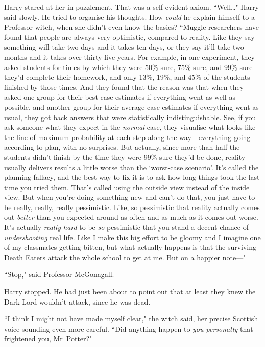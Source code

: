 Harry stared at her in puzzlement. That was a self-evident axiom. ``Well…" Harry said slowly. He tried to organise his thoughts. How \emph{could} he explain himself to a Professor-witch, when she didn't even know the basics? ``Muggle researchers have found that people are always very optimistic, compared to reality. Like they say something will take two days and it takes ten days, or they say it'll take two months and it takes over thirty-five years. For example, in one experiment, they asked students for times by which they were 50\% sure, 75\% sure, and 99\% sure they'd complete their homework, and only 13\%, 19\%, and 45\% of the students finished by those times. And they found that the reason was that when they asked one group for their best-case estimates if everything went as well as possible, and another group for their average-case estimates if everything went as usual, they got back answers that were statistically indistinguishable. See, if you ask someone what they expect in the \emph{normal} case, they visualise what looks like the line of maximum probability at each step along the way—everything going according to plan, with no surprises. But actually, since more than half the students didn't finish by the time they were 99\% sure they'd be done, reality usually delivers results a little worse than the `worst-case scenario'. It's called the planning fallacy, and the best way to fix it is to ask how long things took the last time you tried them. That's called using the outside view instead of the inside view. But when you're doing something new and can't do that, you just have to be really, really, really pessimistic. Like, so pessimistic that reality actually comes out \emph{better} than you expected around as often and as much as it comes out worse. It's actually \emph{really hard} to be \emph{so} pessimistic that you stand a decent chance of \emph{undershooting} real life. Like I make this big effort to be gloomy and I imagine one of my classmates getting bitten, but what actually happens is that the surviving Death Eaters attack the whole school to get at me. But on a happier note—"

``Stop," said Professor McGonagall.

Harry stopped. He had just been about to point out that at least they knew the Dark Lord wouldn't attack, since he was dead.

``I think I might not have made myself clear," the witch said, her precise Scottish voice sounding even more careful. ``Did anything happen to \emph{you personally} that frightened you, Mr~Potter?"

